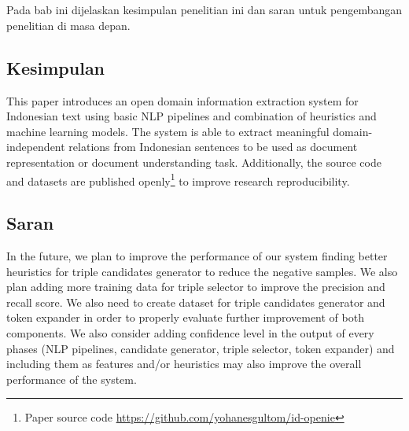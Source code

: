 \chapter{\babLima}
\label{chap:babLima}

Pada bab ini dijelaskan kesimpulan penelitian ini dan saran untuk pengembangan penelitian di masa depan.

\section{Kesimpulan}

This paper introduces an open domain information extraction system for Indonesian text using basic NLP pipelines and combination of heuristics and machine learning models. The system is able to extract meaningful domain-independent relations from Indonesian sentences to be used as document representation or document understanding task. Additionally, the source code and datasets are published openly\footnote{Paper source code \url{https://github.com/yohanesgultom/id-openie}} to improve research reproducibility.

\section{Saran}

In the future, we plan to improve the performance of our system finding better heuristics for triple candidates generator to reduce the negative samples. We also plan adding more training data for triple selector to improve the precision and recall score. We also need to create dataset for triple candidates generator and token expander in order to properly evaluate further improvement of both components. We also consider adding confidence level in the output of every phases (NLP pipelines, candidate generator, triple selector, token expander) and including them as features and/or heuristics may also improve the overall performance of the system.